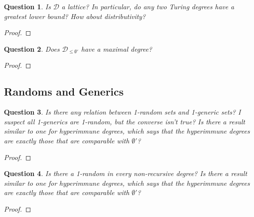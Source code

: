 \documentclass{article}
\newtheorem{question}{Question}[subsection]
\begin{document}
    \begin{question}
      Is $\mathcal{D}$ a lattice? In particular, do any two Turing degrees
      have a greatest lower bound? How about distributivity?
    \end{question}
    \begin{proof}
    \end{proof}

    \begin{question}
      Does $\mathcal{D}_{\leq\emptyset'}$ have a maximal degree?
    \end{question}
    \begin{proof}
    \end{proof}

  \subsection{Randoms and Generics}
    \begin{question}
      Is there any relation between 1-random sets and 1-generic sets? I
      suspect all 1-generics are 1-random, but the converse isn't true? Is
      there a result similar to one for hyperimmune degrees, which says
      that the hyperimmune degrees are exactly those that are comparable
      with $\emptyset'$?
    \end{question}
    \begin{proof}
    \end{proof}

    \begin{question}
      Is there a 1-random in every non-recursive degree? Is there a result
      similar to one for hyperimmune degrees, which says that the
      hyperimmune degrees are exactly those that are comparable with
      $\emptyset'$?
    \end{question}
    \begin{proof}
    \end{proof}
\end{document}
